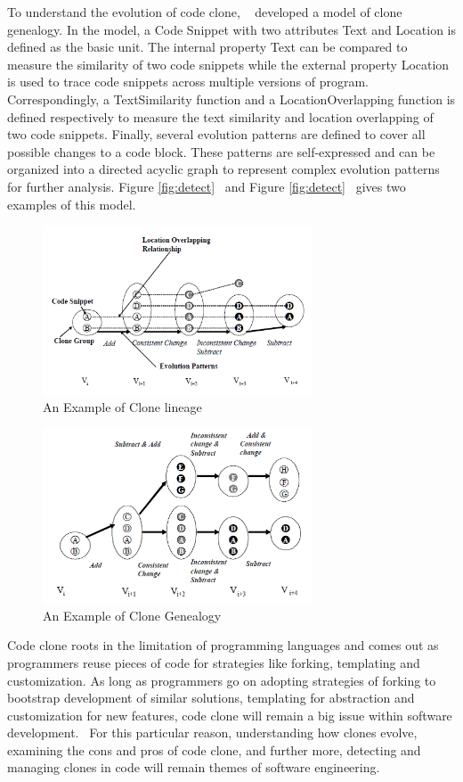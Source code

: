 \documentclass{acm_proc_article-sp}
\begin{document}
To understand the evolution of code clone, ~\cite{empirical} developed a model of clone genealogy. In the model, a Code Snippet with two attributes Text and Location is defined as the basic unit. The internal property Text can be compared to measure the similarity of two code snippets while the external property Location is used to trace code snippets across multiple versions of program. Correspondingly, a TextSimilarity function and a LocationOverlapping function is defined respectively to measure the text similarity and location overlapping of two code snippets. Finally, several evolution patterns are defined to cover all possible changes to a code block. These patterns are self-expressed and can be organized into a directed acyclic graph to represent complex evolution patterns for further analysis. Figure \ref{fig:detect}~\cite{towards_tool} and Figure \ref{fig:detect}~\cite{towards_tool} gives two examples of this model.

 \begin{figure}[h]
 \centering
\includegraphics[width=8cm]{lineage}
\caption{An Example of Clone lineage}
    \label{fig:linea}
\end{figure}

 \begin{figure}[h]
 \centering
\includegraphics[width=8cm]{genealogy}
\caption{An Example of Clone Genealogy}
    \label{fig:genea}
\end{figure}

Code clone roots in the limitation of programming languages and comes out as programmers reuse pieces of code for strategies like forking, templating and customization. As long as programmers go on adopting strategies of forking to bootstrap development of similar solutions, templating for abstraction and customization for new features, code clone will remain a big issue within software development.~\cite{frontiers} For this particular reason, understanding how clones evolve, examining the cons and pros of code clone, and further more, detecting and managing clones in code will remain themes of software engineering.
\end{document}
